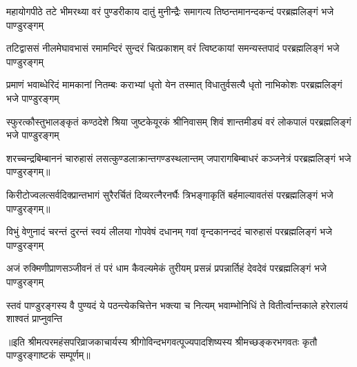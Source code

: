 


\fourlineindentedshloka
{महायोगपीठे तटे भीमरथ्या}
{वरं पुण्डरीकाय दातुं मुनीन्द्रैः}
{समागत्य तिष्ठन्तमानन्दकन्दं}
{परब्रह्मलिङ्गं भजे पाण्डुरङ्गम्} %

\fourlineindentedshloka
{तटिद्वाससं नीलमेघावभासं}
{रमामन्दिरं सुन्दरं चित्प्रकाशम्}
{वरं त्विष्टकायां समन्यस्तपादं}
{परब्रह्मलिङ्गं भजे पाण्डुरङ्गम्} %

\fourlineindentedshloka
{प्रमाणं भवाब्धेरिदं मामकानां}
{नितम्बः कराभ्यां धृतो येन तस्मात्}
{विधातुर्वसत्यै धृतो नाभिकोशः}
{परब्रह्मलिङ्गं भजे पाण्डुरङ्गम्} %

\fourlineindentedshloka
{स्फुरत्कौस्तुभालङ्कृतं कण्ठदेशे}
{श्रिया जुष्टकेयूरकं श्रीनिवासम्}
{शिवं शान्तमीड्यं वरं लोकपालं}
{परब्रह्मलिङ्गं भजे पाण्डुरङ्गम्} %

\fourlineindentedshloka
{शरच्चन्द्रबिम्बाननं चारुहासं}
{लसत्कुण्डलाक्रान्तगण्डस्थलान्तम्}
{जपारागबिम्बाधरं कञ्जनेत्रं}
{परब्रह्मलिङ्गं भजे पाण्डुरङ्गम्॥} %

\fourlineindentedshloka
{किरीटोज्वलत्सर्वदिक्प्रान्तभागं}
{सुरैरर्चितं दिव्यरत्नैरनर्घैः}
{त्रिभङ्गाकृतिं बर्हमाल्यावतंसं}
{परब्रह्मलिङ्गं भजे पाण्डुरङ्गम्॥} %

\fourlineindentedshloka
{विभुं वेणुनादं चरन्तं दुरन्तं}
{स्वयं लीलया गोपवेषं दधानम्}
{गवां वृन्दकानन्ददं चारुहासं}
{परब्रह्मलिङ्गं भजे पाण्डुरङ्गम्} %

\fourlineindentedshloka
{अजं रुक्मिणीप्राणसञ्जीवनं तं}
{परं धाम कैवल्यमेकं तुरीयम्}
{प्रसन्नं प्रपन्नार्तिहं देवदेवं}
{परब्रह्मलिङ्गं भजे पाण्डुरङ्गम्} %

\fourlineindentedshloka
{स्तवं पाण्डुरङ्गस्य वै पुण्यदं ये}
{पठन्त्येकचित्तेन भक्त्या च नित्यम्}
{भवाम्भोनिधिं ते वितीर्त्वान्तकाले}
{हरेरालयं शाश्वतं प्राप्नुवन्ति} 

॥इति श्रीमत्परमहंसपरिव्राजकाचार्यस्य श्रीगोविन्दभगवत्पूज्यपादशिष्यस्य श्रीमच्छङ्करभगवतः कृतौ पाण्डुरङ्गाष्टकं सम्पूर्णम्॥